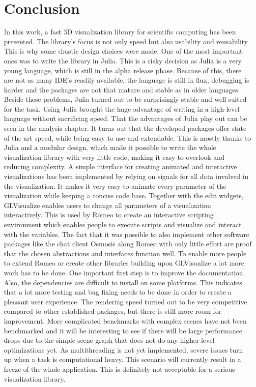 \section{Conclusion}

In this work, a fast 3D visualization library for scientific computing has been presented. 
The library's focus is not only speed but also usability and reusability. 
This is why some drastic design choices were made.
One of the most important ones was to write the library in Julia. 
This is a risky decision as Julia is a very young language, which is still in the alpha release phase. 
Because of this, there are not as many IDE's readily available, the language is still in flux, debugging is harder and the packages are not that mature and stable as in older languages.
Beside these problems, Julia turned out to be surprisingly stable and well suited for the task.
Using Julia brought the huge advantage of writing in a high-level language without sacrificing speed. 
That the advantages of Julia play out can be seen in the analysis chapter. It turns out that the developed packages offer state of the art speed, while being easy to use and extendable. 
This is mostly thanks to Julia and a modular design, which made it possible to write the whole visualization library with very little code, making it easy to overlook and reducing complexity. 
A simple interface for creating animated and interactive visualizations has been implemented by relying on signals for all data involved in the visualization.
It makes it very easy to animate every parameter of the visualization while keeping a concise code base.
Together with the edit widgets, GLVisualize enables users to change all parameters of a visualization interactively. 
This is used by Romeo to create an interactive scripting environment which enables people to execute scripts and visualize and interact with the variables.
The fact that it was possible to also implement other software packages like the chat client Osmosis along Romeo with only little effort are proof that the chosen abstractions and interfaces function well.
To enable more people to extend Romeo or create other libraries building upon GLVisualize a lot more work has to be done. 
One important first step is to improve the documentation. 
Also, the dependencies are difficult to install on some platforms. This indicates that a lot more testing and bug fixing needs to be done in order to create a pleasant user experience.
The rendering speed turned out to be very competitive compared to other established packages, but there is still more room for improvement.
More complicated benchmarks with complex scenes have not been benchmarked and it will be interesting to see if there will be large performance drops due to the simple scene graph that does not do any higher level optimizations yet.
As multithreading is not yet implemented, severe issues turn up when a task is computational heavy. This scenario will currently result in a freeze of the whole application. This is definitely not acceptable for a serious visualization library.
 
